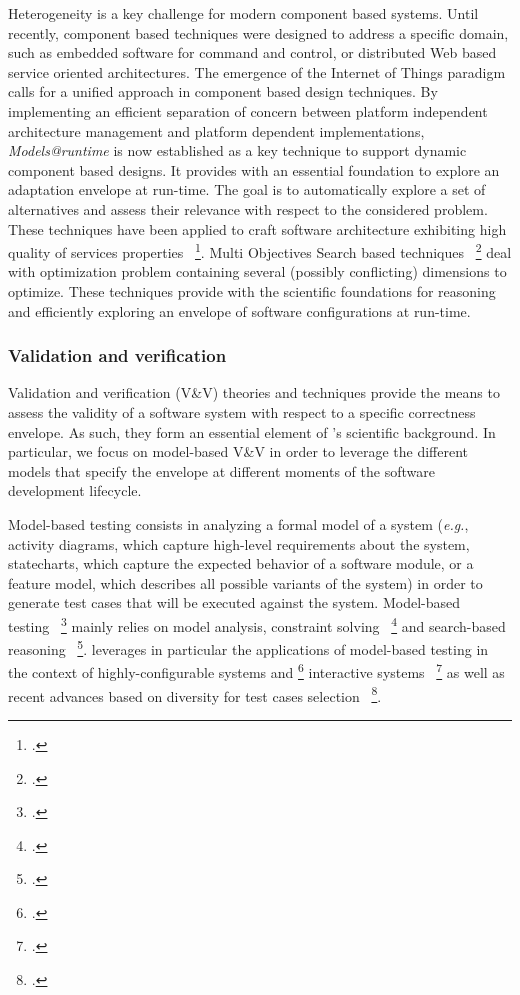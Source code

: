 Heterogeneity is a key challenge for modern component based systems. 
Until recently, component based techniques were designed to address a specific domain, such as embedded software for command and control, or distributed Web based service oriented architectures.
The emergence of the Internet of Things paradigm calls for a unified approach in component based design techniques.
By implementing an efficient separation of concern between platform independent architecture management and platform dependent implementations,
\textit{Models@runtime}  is now established as a key technique to support dynamic  component based designs. It provides \team{} with an essential foundation to explore an adaptation envelope at run-time. 
The goal is to automatically  explore a set of alternatives and assess their relevance with respect to the considered problem. 
These techniques have been applied to craft software architecture exhibiting high quality of services properties~ \footcite{frey2013search}. 
Multi  Objectives Search based techniques~ \footcite{deb2002fast} deal with optimization problem containing several (possibly conflicting) dimensions to optimize. 
These techniques provide \team{} with the scientific foundations for reasoning and efficiently exploring an envelope of software configurations at run-time.
 
\subsubsection{Validation and verification}

Validation and verification (V\&V) theories and techniques provide the means to assess the validity of a software system with respect to a specific correctness envelope. As such, they form an essential element of \team{}'s scientific background. In particular, we focus on model-based V\&V in order to leverage the different models that specify the envelope at different moments of the software development lifecycle.

Model-based testing consists in analyzing a formal model of a system (\textit{e.g.}, activity diagrams, which capture high-level requirements about the system, statecharts, which capture the expected behavior of a software module, or a feature model, which describes all possible variants of the system) in order to generate test cases that will be executed against the system. Model-based testing~ \footcite{utting2010practical} mainly relies on model analysis, constraint solving~ \footcite{demilli1991constraint} and search-based reasoning~ \footcite{mcminn2004search}. \team{} leverages in particular the applications of model-based testing in the context of highly-configurable systems and     \footcite{yilmaz2006covering} interactive systems~ \footcite{memon2007event} as well as recent advances based on diversity for test cases selection~ \footcite{HemmatiBAA10}.

